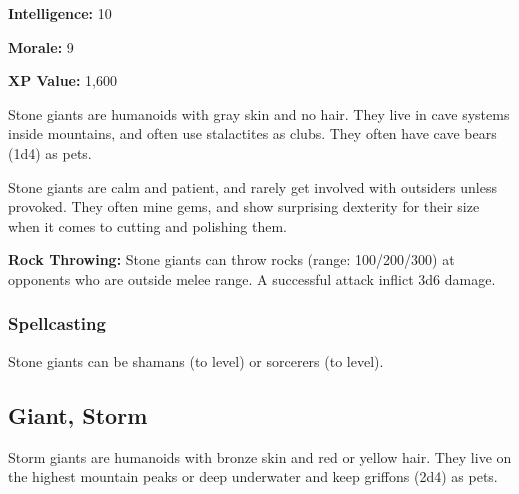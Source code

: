 \begin{multicols*}{2}
{\textbf{Intelligence:} 10

\textbf{Morale:} 9

\textbf{XP Value:} 1,600}

Stone giants are humanoids with gray skin and no hair. They live in cave systems inside mountains, and often use stalactites as clubs. They often have cave bears (1d4) as pets.

Stone giants are calm and patient, and rarely get involved with outsiders unless provoked. They often mine gems, and show surprising dexterity for their size when it comes to cutting and polishing them.

\textbf{Rock Throwing:} Stone giants can throw rocks (range: 100/200/300) at opponents who are outside melee range. A successful attack inflict 3d6 damage.

\subsubsection{Spellcasting}
Stone giants can be shamans (to  level) or sorcerers (to  level).

\subsection{Giant, Storm}

Storm giants are humanoids with bronze skin and red or yellow hair. They live on the highest mountain peaks or deep underwater and keep griffons (2d4) as pets.


\end{multicols*}
